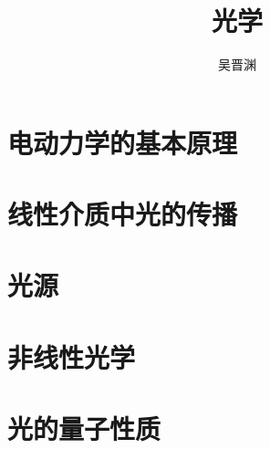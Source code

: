 \documentclass[hyperref, UTF8, a4paper, oneside]{ctexbook}
\title{光学}
\author{吴晋渊}
\numberwithin{equation}{chapter}
\begin{document}
\maketitle

\part{电动力学的基本原理}



\part{线性介质中光的传播}







\part{光源}\label{part:source}



\part{非线性光学}







\part{光的量子性质}




 
\end{document}
